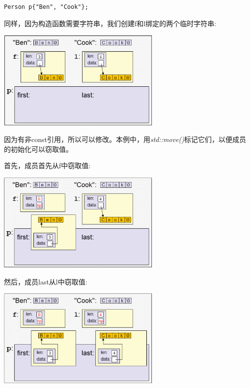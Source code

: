 \begin{lstlisting}[caption={}]
Person p{"Ben", "Cook"};
\end{lstlisting}

同样，因为构造函数需要字符串，我们创建f和l绑定的两个临时字符串:\par

\begin{center}
	\includegraphics[width=0.6\textwidth]{content/1/chapter4/images/8}
\end{center}

因为有非const引用，所以可以修改。本例中，用\textit{std::move()}标记它们，以便成员的初始化可以窃取值。\par

首先，成员首先从f中窃取值:\par

\begin{center}
	\includegraphics[width=0.6\textwidth]{content/1/chapter4/images/9}
\end{center}

然后，成员last从l中窃取值:\par

\begin{center}
	\includegraphics[width=0.6\textwidth]{content/1/chapter4/images/10}
\end{center}

